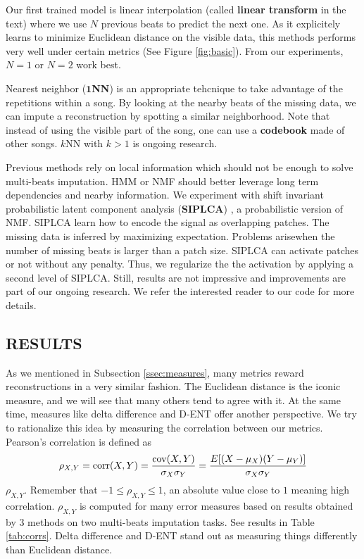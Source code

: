 \documentclass{article}
\begin{document}
Our first trained model is linear interpolation (called \textbf{linear
  transform} in the text) where we use $N$ previous beats to predict
the next one.  As it explicitely learns to minimize Euclidean distance
on the visible data, this methods performs very well under certain
metrics (See Figure \ref{fig:basic}). From our experiments, $N=1$ or
$N=2$ work best.

Nearest neighbor ($\mathbf{1}$\textbf{NN}) is an appropriate tehcnique
to take advantage of the repetitions within a song. By looking at the
nearby beats of the missing data, we can impute a reconstruction by
spotting a similar neighborhood. Note that instead of using the
visible part of the song, one can use a \textbf{codebook} made of
other songs.  $k$NN with $k>1$ is ongoing research.

Previous methods rely on local information which should not be enough
to solve multi-beats imputation. HMM or NMF should better leverage
long term dependencies and nearby information.  We experiment with
shift invariant probabilistic latent component analysis
(\textbf{SIPLCA}) \cite{Smaragdis2009,Weiss2010}, a probabilistic
version of NMF. SIPLCA learn how to encode the signal as overlapping
patches. The missing data is inferred by maximizing expectation.
Problems arisewhen the number of missing beats is larger than a patch
size. SIPLCA can activate patches or not without any penalty. Thus, we
regularize the the activation by applying a second level of SIPLCA.
Still, results are not impressive and improvements are part of our
ongoing research. We refer the interested reader to our code for more
details.



\subsection{RESULTS}
\label{ssec:results}
As we mentioned in Subsection \ref{ssec:measures}, many metrics reward
reconstructions in a very similar fashion. The Euclidean distance is
the iconic measure, and we will see that many others tend to agree
with it. At the same time, measures like delta difference and D-ENT
offer another perspective. We try to rationalize this idea by
measuring the correlation between our metrics. Pearson's
correlation is defined as
\[  \rho_{X,Y}=\mathrm{corr}(X,Y)={\mathrm{cov}(X,Y) \over \sigma_X
    \sigma_Y} ={E[(X-\mu_X)(Y-\mu_Y)] \over \sigma_X\sigma_Y}
\]
$\rho_{X,Y}$. Remember that $-1 \leq \rho_{X,Y} \leq 1$, an absolute
value close to $1$ meaning high correlation. $\rho_{X,Y}$ is computed
for many error measures based on results obtained by $3$ methods on
two multi-beats imputation tasks. See results in Table
\ref{tab:corrs}. Delta difference and D-ENT stand out as measuring
things differently than Euclidean distance.
\end{document}
